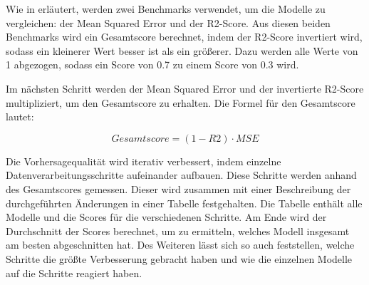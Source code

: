 Wie in  erläutert, werden zwei Benchmarks verwendet, um die Modelle zu vergleichen: der Mean Squared Error und der R2-Score. Aus diesen beiden Benchmarks wird ein Gesamtscore berechnet, indem der R2-Score invertiert wird, sodass ein kleinerer Wert besser ist als ein größerer. Dazu werden alle Werte von 1 abgezogen, sodass ein Score von 0.7 zu einem Score von 0.3 wird.

Im nächsten Schritt werden der Mean Squared Error und der invertierte R2-Score multipliziert, um den Gesamtscore zu erhalten. Die Formel für den Gesamtscore lautet:

\begin{equation}
    \textit{Gesamtscore} = (1 - \textit{R2}) \cdot \textit{MSE}
\end{equation}

Die Vorhersagequalität wird iterativ verbessert, indem einzelne Datenverarbeitungsschritte aufeinander aufbauen. Diese Schritte werden anhand des Gesamtscores gemessen. Dieser wird zusammen mit einer Beschreibung der durchgeführten Änderungen in einer Tabelle festgehalten. Die Tabelle enthält alle Modelle und die Scores für die verschiedenen Schritte. Am Ende wird der Durchschnitt der Scores berechnet, um zu ermitteln, welches Modell insgesamt am besten abgeschnitten hat. Des Weiteren lässt sich so auch feststellen, welche Schritte die größte Verbesserung gebracht haben und wie die einzelnen Modelle auf die Schritte reagiert haben.